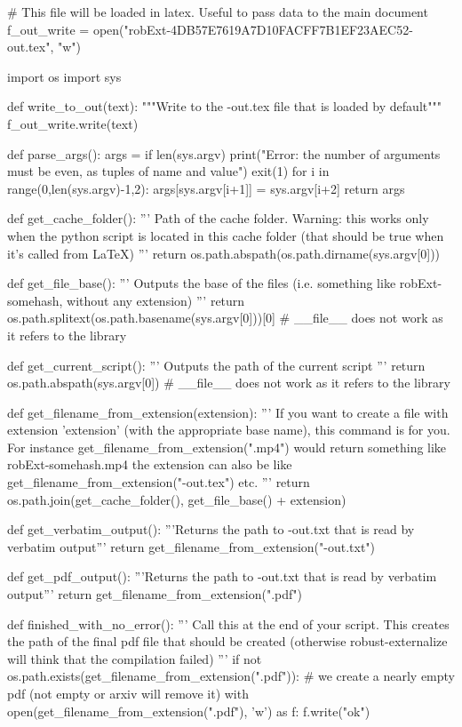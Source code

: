 
# This file will be loaded in latex. Useful to pass data to the main document
f_out_write = open("robExt-4DB57E7619A7D10FACFF7B1EF23AEC52-out.tex", "w")

import os
import sys

def write_to_out(text):
    """Write to the -out.tex file that is loaded by default"""
    f_out_write.write(text)

def parse_args():
    args = {}
    if len(sys.argv) %
        print("Error: the number of arguments must be even, as tuples of name and value")
        exit(1)
    for i in range(0,len(sys.argv)-1,2):
        args[sys.argv[i+1]] = sys.argv[i+2]
    return args

def get_cache_folder():
    '''
    Path of the cache folder. Warning: this works only when the python script
    is located in this cache folder (that should be true when it's called from LaTeX)
    '''
    return os.path.abspath(os.path.dirname(sys.argv[0]))

def get_file_base():
    '''
    Outputs the base of the files (i.e. something like robExt-somehash, without any extension)
    '''
    return os.path.splitext(os.path.basename(sys.argv[0]))[0] # __file__ does not work as it refers to the library

def get_current_script():
    '''
    Outputs the path of the current script
    '''
    return os.path.abspath(sys.argv[0]) # __file__ does not work as it refers to the library


def get_filename_from_extension(extension):
    '''
    If you want to create a file with extension 'extension' (with the appropriate base name), this command
    is for you. For instance get_filename_from_extension(".mp4") would return something like
    robExt-somehash.mp4
    the extension can also be like get_filename_from_extension("-out.tex") etc.
    '''
    return os.path.join(get_cache_folder(), get_file_base() + extension)

def get_verbatim_output():
    '''Returns the path to -out.txt that is read by verbatim output'''
    return get_filename_from_extension("-out.txt")

def get_pdf_output():
    '''Returns the path to -out.txt that is read by verbatim output'''
    return get_filename_from_extension(".pdf")


def finished_with_no_error():
    '''
    Call this at the end of your script. This creates the path of the final pdf file that should be
    created (otherwise robust-externalize will think that the compilation failed)
    '''
    if not os.path.exists(get_filename_from_extension(".pdf")):
        # we create a nearly empty pdf (not empty or arxiv will remove it)
        with open(get_filename_from_extension(".pdf"), 'w') as f:
            f.write("ok")

